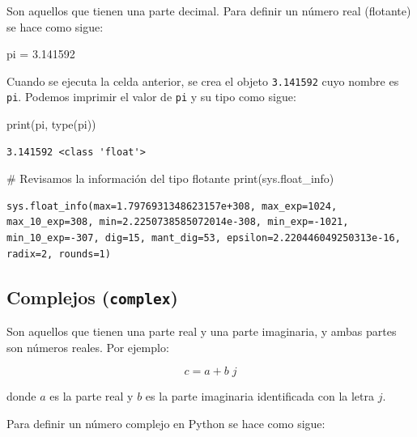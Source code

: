 \documentclass[
  spanish,
  letterpaper,
]{scrbook}
\newenvironment{Shaded}{\begin{snugshade}}{\end{snugshade}}
\newcommand{\BuiltInTok}[1]{\textcolor[rgb]{0.00,0.23,0.31}{#1}}
\newcommand{\CommentTok}[1]{\textcolor[rgb]{0.37,0.37,0.37}{#1}}
\newcommand{\FloatTok}[1]{\textcolor[rgb]{0.68,0.00,0.00}{#1}}
\newcommand{\NormalTok}[1]{\textcolor[rgb]{0.00,0.23,0.31}{#1}}
\newcommand{\OperatorTok}[1]{\textcolor[rgb]{0.37,0.37,0.37}{#1}}
\theoremstyle{definition}
\theoremstyle{remark}
\begin{document}
Son aquellos que tienen una parte decimal. Para definir un número real
(flotante) se hace como sigue:

\begin{Shaded}
\begin{Highlighting}[]
\NormalTok{pi }\OperatorTok{=} \FloatTok{3.141592}
\end{Highlighting}
\end{Shaded}

Cuando se ejecuta la celda anterior, se crea el objeto \texttt{3.141592}
cuyo nombre es \texttt{pi}. Podemos imprimir el valor de \texttt{pi} y
su tipo como sigue:

\begin{Shaded}
\begin{Highlighting}[]
\BuiltInTok{print}\NormalTok{(pi, }\BuiltInTok{type}\NormalTok{(pi))}
\end{Highlighting}
\end{Shaded}

\begin{verbatim}
3.141592 <class 'float'>
\end{verbatim}

\begin{Shaded}
\begin{Highlighting}[]
\CommentTok{\# Revisamos la información del tipo flotante}
\BuiltInTok{print}\NormalTok{(sys.float\_info)}
\end{Highlighting}
\end{Shaded}

\begin{verbatim}
sys.float_info(max=1.7976931348623157e+308, max_exp=1024, max_10_exp=308, min=2.2250738585072014e-308, min_exp=-1021, min_10_exp=-307, dig=15, mant_dig=53, epsilon=2.220446049250313e-16, radix=2, rounds=1)
\end{verbatim}

\subsection{\texorpdfstring{Complejos
(\texttt{complex})}{Complejos (complex)}}\label{complejos-complex}

Son aquellos que tienen una parte real y una parte imaginaria, y ambas
partes son números reales. Por ejemplo:

\[
c = a + b \; j
\]

donde \(a\) es la parte real y \(b\) es la parte imaginaria identificada
con la letra \(j\).

Para definir un número complejo en Python se hace como sigue:
\end{document}
